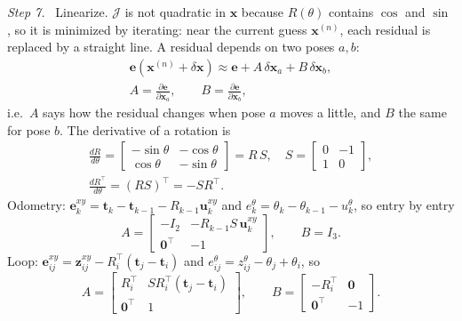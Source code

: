 \documentclass[letterpaper, 10pt, conference]{ieeeconf}
\newcommand{\tb}{\mathbf{t}}
\newcommand{\x}{\mathbf{x}}
\newcommand{\step}[1]{\par\noindent\textit{Step #1.}\ }
\begin{document}
\step{7} Linearize. $\mathcal{J}$ is not quadratic in $\x$ because $R(\theta)$
contains $\cos$ and $\sin$, so it is minimized by iterating: near the
current guess $\x^{(n)}$, each residual is replaced by a straight line.
A residual depends on two poses $a,b$:
\begin{equation}
\begin{gathered}
\mathbf{e}(\x^{(n)}+\delta\x)\approx\mathbf{e}+A\,\delta\x_a+B\,\delta\x_b,\\
A=\frac{\partial\mathbf{e}}{\partial\x_a},\qquad B=\frac{\partial\mathbf{e}}{\partial\x_b},
\end{gathered}
\end{equation}
i.e.\ $A$ says how the residual changes when pose $a$ moves a little, and
$B$ the same for pose $b$. The derivative of a rotation is
\begin{equation}
\begin{gathered}
\frac{dR}{d\theta}=\begin{bmatrix}-\sin\theta&-\cos\theta\\ \cos\theta&-\sin\theta\end{bmatrix}=R\,S,\quad
S=\begin{bmatrix}0&-1\\1&0\end{bmatrix},\\
\frac{dR^\top}{d\theta}=(RS)^\top=-S R^\top.
\end{gathered}
\end{equation}
Odometry: $\mathbf{e}^{xy}_k=\tb_k-\tb_{k-1}-R_{k-1}\mathbf{u}^{xy}_k$ and
$e^\theta_k=\theta_k-\theta_{k-1}-u^\theta_k$, so entry by entry
\begin{equation}
A=\begin{bmatrix}-I_2&-R_{k-1}S\,\mathbf{u}^{xy}_k\\ \mathbf{0}^\top&-1\end{bmatrix},\qquad B=I_3.
\end{equation}
Loop: $\mathbf{e}^{xy}_{ij}=\mathbf{z}^{xy}_{ij}-R_i^\top(\tb_j-\tb_i)$ and
$e^\theta_{ij}=z^\theta_{ij}-\theta_j+\theta_i$, so
\begin{equation}
A=\begin{bmatrix}R_i^\top&S R_i^\top(\tb_j-\tb_i)\\ \mathbf{0}^\top&1\end{bmatrix},\qquad
B=\begin{bmatrix}-R_i^\top&\mathbf{0}\\ \mathbf{0}^\top&-1\end{bmatrix}.
\end{equation}
\end{document}
